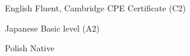 \begin{absolutelynopagebreak}


\begin{cvskills}

  \cvskill
    {English} %
    {Fluent, Cambridge CPE Certificate (C2)} %

  \cvskill
    {Japanese} %
    {Basic level (A2)} %

  \cvskill
    {Polish} %
    {Native} %


\end{cvskills}
\end{absolutelynopagebreak}